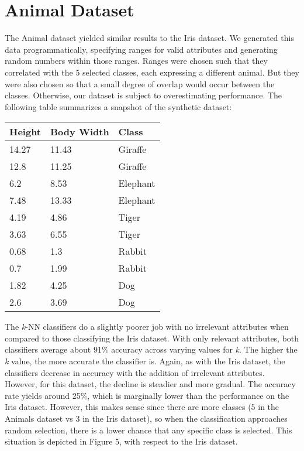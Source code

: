 \documentclass{article}
\begin{document}
\section{Animal Dataset}

The Animal dataset yielded similar results to the Iris dataset. We generated this data programmatically, specifying ranges for valid attributes and generating random numbers within those ranges. Ranges were chosen such that they correlated with the 5 selected classes, each expressing a different animal. But they were also chosen so that a small degree of overlap would occur between the classes. Otherwise, our dataset is subject to overestimating performance. The following table summarizes a snapshot of the synthetic dataset: 

\begin{center}
\begin{tabular}{ | l | l | l | }
\hline
\textbf{Height} & \textbf{Body Width} & \textbf{Class} \\ 
\hline
\hline
14.27 & 11.43 & Giraffe \\ \hline
12.8 & 11.25 & Giraffe \\ \hline
6.2 & 8.53 & Elephant \\ \hline
7.48 & 13.33 & Elephant \\ \hline
4.19 & 4.86 & Tiger \\ \hline
3.63 & 6.55 & Tiger \\ \hline
0.68 & 1.3 & Rabbit \\ \hline 
0.7 & 1.99 & Rabbit \\ \hline
1.82 & 4.25 & Dog \\ \hline
2.6 & 3.69 & Dog \\ \hline

\end{tabular}
\end{center}

The \textit{k}-NN classifiers do a slightly poorer job with no irrelevant attributes when compared to those classifying the Iris dataset. With only relevant attributes, both classifiers average about 91\% accuracy across varying values for \textit{k}. The higher the \textit{k} value, the more accurate the classifier is. Again, as with the Iris dataset, the classifiers decrease in accuracy with the addition of irrelevant attributes. However, for this dataset, the decline is steadier and more gradual. The accuracy rate yields around 25\%, which is marginally lower than the performance on the Iris dataset. However, this makes sense since there are more classes (5 in the Animals dataset vs 3 in the Iris dataset), so when the classification approaches random selection, there is a lower chance that any specific class is selected. This situation is depicted in Figure 5, with respect to the Iris dataset.  
\end{document}
